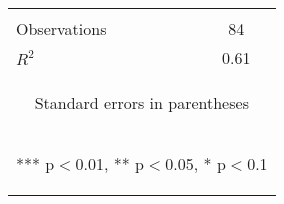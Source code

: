 \begin{center}
\begin{tabular}{lc}
\vspace{4pt} & \begin{footnotesize}\end{footnotesize} \\
Observations & 84 \\
 $R^2$ & 0.61 \\ \hline
\multicolumn{2}{c}{\begin{footnotesize} Standard errors in parentheses\end{footnotesize}} \\
\multicolumn{2}{c}{\begin{footnotesize} *** p$<$0.01, ** p$<$0.05, * p$<$0.1\end{footnotesize}} \\
\end{tabular}
\end{center}
